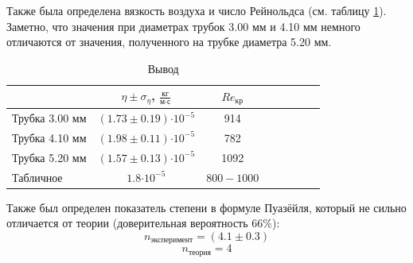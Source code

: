 \documentclass[12pt,a4paper]{article}
\newcommand{\e}[1]{\text{$\cdot10^{#1}$}}
\newcommand{\uf}[2]{\text{$\frac{\text{#1}}{\text{#2}}$}}
\begin{document}
Также была определена вязкость воздуха и число Рейнольдса (см. таблицу \ref{tab:vivod}).
Заметно, что значения при диаметрах трубок 3.00 мм и 4.10 мм немного отличаются от значения, полученного на трубке диаметра 5.20 мм.
\begin{table}[H]
	\caption{Вывод}
	\label{tab:vivod}
	\centering
	\footnotesize
	\begin{tabular}{lccccccc}
		\toprule
		
		& $\eta \pm \sigma_{\eta}$, $\uf{кг}{м$\cdot$с}$ & $Re_{\text{кр}}$\\
		\midrule
		Трубка 3.00 мм &  $(1.73\pm0.19)\e{-5}$ & 914\\ 
		Трубка 4.10 мм &  $(1.98\pm0.11)\e{-5}$ &  782\\ 
		Трубка 5.20 мм & $(1.57\pm0.13)\e{-5}$ &  1092\\ 
		Табличное & $1.8\e{-5}$ &  $800-1000$\\
		\bottomrule
	\end{tabular}
\end{table}
Также был определен показатель степени в формуле Пуазёйля, который не сильно отличается от теории (доверительная вероятность $66\%$):
$$n_{\text{эксперимент}} = (4.1\pm 0.3)$$
$$n_{\text{теория}} = 4$$
\end{document}
